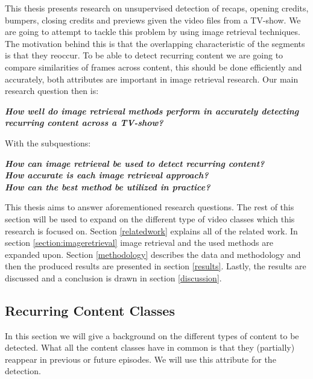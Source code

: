 \documentclass{article}
\begin{document}
This thesis presents research on unsupervised detection of recaps, opening credits, bumpers, closing credits and previews given the video files from a TV-show. We are going to attempt to tackle this problem by using image retrieval techniques. The motivation behind this is that the overlapping characteristic of the segments is that they reoccur. To be able to detect recurring content we are going to compare similarities of frames across content, this should be done efficiently and accurately, both attributes are important in image retrieval research. Our main research question then is:
\newline
\begin{adjustwidth}{0.3in}{0.3in}
\textit{\textbf{How well do image retrieval methods perform in accurately detecting recurring content across a TV-show?\newline}}
\end{adjustwidth}
With the subquestions: \\
\begin{adjustwidth}{0.3in}{0.3in}
	\textit{\textbf{How can image retrieval be used to detect recurring content?\newline}}\\
	\textit{\textbf{How accurate is each image retrieval approach?\newline}}\\
	\textit{\textbf{How can the best method be utilized in practice?\newline}}
\end{adjustwidth}
This thesis aims to answer aforementioned research questions. The rest of this section will be used to expand on the different type of video classes which this research is focused on. Section \ref{relatedwork} explains all of the related work. In section \ref{section:imageretrieval} image retrieval and the used methods are expanded upon. Section \ref{methodology} describes the data and methodology and then the produced results are presented in section \ref{results}. Lastly, the results are discussed and a conclusion is drawn in section \ref{discussion}.

\subsection{Recurring Content Classes} \label{section:segmentclasses}
In this section we will give a background on the different types of content to be detected. What all the content classes have in common is that they (partially) reappear in previous or future episodes. We will use this attribute for the detection. 
\end{document}
